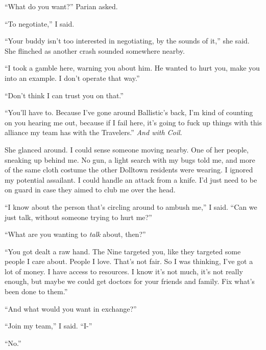``What do you want?''  Parian asked.



``To negotiate,'' I said.



``Your buddy isn't too interested in negotiating, by the sounds of it,'' she said.  She flinched as another crash sounded somewhere nearby.



``I took a gamble here, warning you about him.  He wanted to hurt you, make you into an example.  I don't operate that way.''



``Don't think I can trust you on that.''



``You'll have to.  Because I've gone around Ballistic's back, I'm kind of counting on you hearing me out, because if I fail here, it's going to fuck up things with this alliance my team has with the Travelers.''  \emph{And with Coil}.



She glanced around.  I could sense someone moving nearby.  One of her people, sneaking up behind me.  No gun, a light search with my bugs told me, and more of the same cloth costume the other Dolltown residents were wearing.  I ignored my potential assailant.  I could handle an attack from a knife.  I'd just need to be on guard in case they aimed to club me over the head.



``I know about the person that's circling around to ambush me,'' I said.  ``Can we just talk, without someone trying to hurt me?''



``What are you wanting to \emph{talk} about, then?''



``You got dealt a raw hand.  The Nine targeted you, like they targeted some people I care about.  People I love.  That's not fair.  So I was thinking, I've got a lot of money.  I have access to resources.  I know it's not much, it's not really enough, but maybe we could get doctors for your friends and family.  Fix what's been done to them.''



``And what would you want in exchange?''



``Join my team,'' I said.  ``I-''



``No.''



